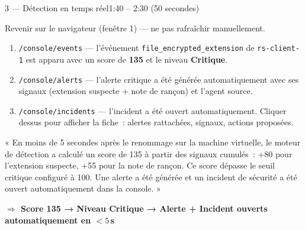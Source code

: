 \documentclass[a4paper,11pt]{article}
\newcommand{\clic}[1]{\texttt{\small #1}}
\newcommand{\resultat}[1]{\textbf{\textcolor{ifriblue}{$\Rightarrow$ #1}}}
\begin{document}
\vspace{6pt}

\begin{etapebox}{3 --- Détection en temps réel}{1:40 -- 2:30 \textnormal{(50 secondes)}}

\begin{montrerbox}
Revenir sur le navigateur (fenêtre 1) --- ne pas rafraîchir manuellement.
\begin{enumerate}[leftmargin=1.5em,itemsep=3pt]
  \item \clic{/console/events} --- l'événement \texttt{file\_encrypted\_extension}
    de \texttt{rs-client-1} est apparu avec un score de \textbf{135} et le niveau \textbf{Critique}.
  \item \clic{/console/alerts} --- l'alerte critique a été générée automatiquement
    avec ses signaux (extension suspecte + note de rançon) et l'agent source.
  \item \clic{/console/incidents} --- l'incident a été ouvert automatiquement.
    Cliquer dessus pour afficher la fiche~: alertes rattachées, signaux, actions proposées.
\end{enumerate}
\end{montrerbox}

\vspace{5pt}

\begin{direbox}
« En moins de 5 secondes après le renommage sur la machine virtuelle,
le moteur de détection a calculé un score de 135 à partir des signaux cumulés~:
+80 pour l'extension suspecte, +55 pour la note de rançon.
Ce score dépasse le seuil critique configuré à 100.
Une alerte a été générée et un incident de sécurité a été ouvert automatiquement dans la console. »
\end{direbox}

\resultat{Score 135 → Niveau Critique → Alerte + Incident ouverts automatiquement en $< 5$\,s}

\end{etapebox}

\vspace{6pt}
\end{document}
